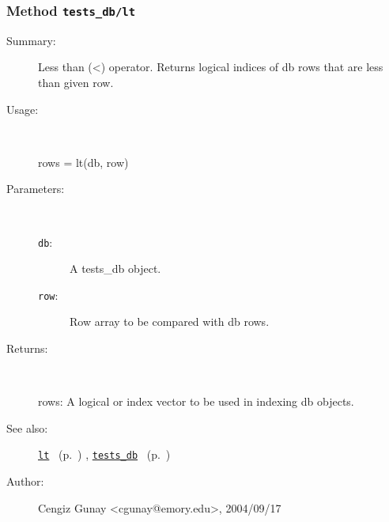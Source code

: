 \subsubsection[Method \texttt{lt}]{Method \texttt{tests\_db/lt}}%
%
\label{ref_tests_db__lt}%
\hypertarget{ref_tests_db__lt}{}%
\begin{description}
\item[Summary:]Less than (<) operator. Returns logical indices of db rows 
	that are less than given row.
%
\item[Usage:]~%
\begin{lyxcode}%
rows = lt(db, row)
%
\end{lyxcode}%
%
%
\item[Parameters:]~
\begin{description}%
\item[\texttt{db}:]
 A tests\_db object.
\item[\texttt{row}:]
 Row array to be compared with db rows.
\end{description}%
%
\item[Returns:]~

	rows: A logical or index vector to be used in indexing db objects. 
%
%
\item[See also:]%
\hyperlink{ref_lt}{\texttt{lt}}%
\ (p.~\pageref{ref_lt})%
%
, \hyperlink{ref_tests_db}{\texttt{tests\_db}}%
\ (p.~\pageref{ref_tests_db})%
%
%
\item[Author:]%
Cengiz Gunay <cgunay@emory.edu>, 2004/09/17%
\end{description}
\methodline%
